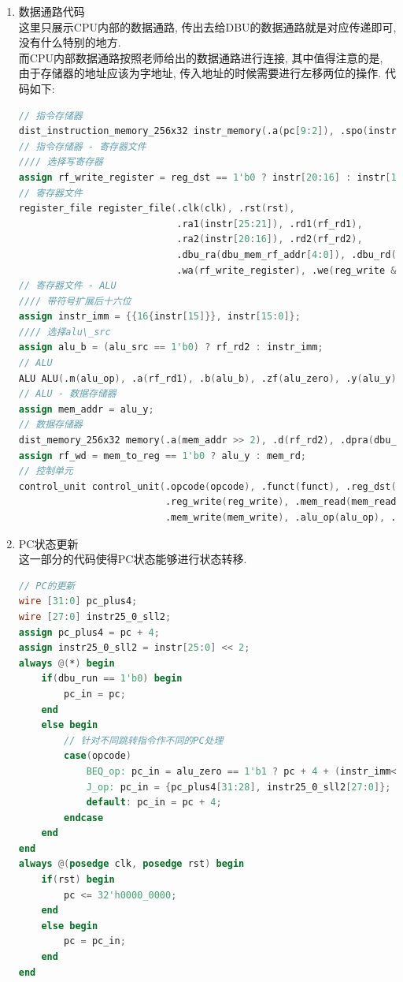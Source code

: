 \documentclass[UTF8]{article}
\begin{document}
\begin{enumerate}
	\item 数据通路代码\\
	这里只展示CPU内部的数据通路, 传出去给DBU的数据通路就是对应传递即可, 没有什么特别的地方.\\
	而CPU内部数据通路按照老师给出的数据通路进行连接, 其中值得注意的是, 由于存储器的地址应该为字地址, 传入地址的时候需要进行左移两位的操作. 代码如下:
	\begin{lstlisting}[language=verilog]
// 指令存储器
dist_instruction_memory_256x32 instr_memory(.a(pc[9:2]), .spo(instr));
// 指令存储器 - 寄存器文件
//// 选择写寄存器
assign rf_write_register = reg_dst == 1'b0 ? instr[20:16] : instr[15:11];
// 寄存器文件
register_file register_file(.clk(clk), .rst(rst),
                            .ra1(instr[25:21]), .rd1(rf_rd1),
                            .ra2(instr[20:16]), .rd2(rf_rd2),
                            .dbu_ra(dbu_mem_rf_addr[4:0]), .dbu_rd(dbu_rf_data),
                            .wa(rf_write_register), .we(reg_write & dbu_run), .wd(rf_wd));
// 寄存器文件 - ALU
//// 带符号扩展后十六位
assign instr_imm = {{16{instr[15]}}, instr[15:0]};
//// 选择alu\_src
assign alu_b = (alu_src == 1'b0) ? rf_rd2 : instr_imm;
// ALU
ALU ALU(.m(alu_op), .a(rf_rd1), .b(alu_b), .zf(alu_zero), .y(alu_y));
// ALU - 数据存储器
assign mem_addr = alu_y;
// 数据存储器
dist_memory_256x32 memory(.a(mem_addr >> 2), .d(rf_rd2), .dpra(dbu_mem_rf_addr), .clk(clk), .we(mem_write & dbu_run), .spo(mem_rd), .dpo(dbu_mem_data));
assign rf_wd = mem_to_reg == 1'b0 ? alu_y : mem_rd;
// 控制单元
control_unit control_unit(.opcode(opcode), .funct(funct), .reg_dst(reg_dst),
						  .reg_write(reg_write), .mem_read(mem_read),.mem_to_reg(mem_to_reg),
						  .mem_write(mem_write), .alu_op(alu_op), .alu_src(alu_src));
	\end{lstlisting}
	
	\item PC状态更新\\
	这一部分的代码使得PC状态能够进行状态转移.
	\begin{lstlisting}[language=verilog]
// PC的更新
wire [31:0] pc_plus4;
wire [27:0] instr25_0_sll2;
assign pc_plus4 = pc + 4;
assign instr25_0_sll2 = instr[25:0] << 2;
always @(*) begin
    if(dbu_run == 1'b0) begin
        pc_in = pc;
    end
    else begin
    	// 针对不同跳转指令作不同的PC处理
        case(opcode)
            BEQ_op: pc_in = alu_zero == 1'b1 ? pc + 4 + (instr_imm<<2) : pc + 4;
            J_op: pc_in = {pc_plus4[31:28], instr25_0_sll2[27:0]};
            default: pc_in = pc + 4;
        endcase
    end
end
always @(posedge clk, posedge rst) begin
    if(rst) begin
        pc <= 32'h0000_0000;
    end
    else begin
        pc = pc_in;
    end
end
	\end{lstlisting}
	

\end{enumerate}
\end{document}
